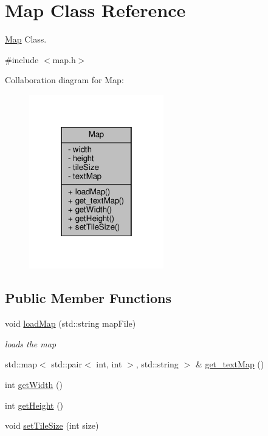 \hypertarget{classMap}{}\section{Map Class Reference}
\label{classMap}


\hyperlink{classMap}{Map} Class.  




{\ttfamily \#include $<$map.\+h$>$}



Collaboration diagram for Map\+:
\nopagebreak
\begin{figure}[H]
\begin{center}
\leavevmode
\includegraphics[width=166pt]{classMap__coll__graph}
\end{center}
\end{figure}
\subsection*{Public Member Functions}
\begin{DoxyCompactItemize}
\item 
void \hyperlink{classMap_af48de256cfde701cd70a17bce1c5b727}{load\+Map} (std\+::string map\+File)
\begin{DoxyCompactList}\small\item\em loads the map \end{DoxyCompactList}\item 
std\+::map$<$ std\+::pair$<$ int, int $>$, std\+::string $>$ \& \hyperlink{classMap_ac4b82fa93d76c5891fc18212cd3d9098}{get\+\_\+text\+Map} ()
\item 
int \hyperlink{classMap_afd34d12227676b3cebeed9f5fae2508f}{get\+Width} ()
\item 
int \hyperlink{classMap_a2b09c8875af2efb711fc3a022e70427d}{get\+Height} ()
\item 
void \hyperlink{classMap_a6d9c1f8a1f65316a7a65983ad7ea9ff4}{set\+Tile\+Size} (int size)
\end{DoxyCompactItemize}
